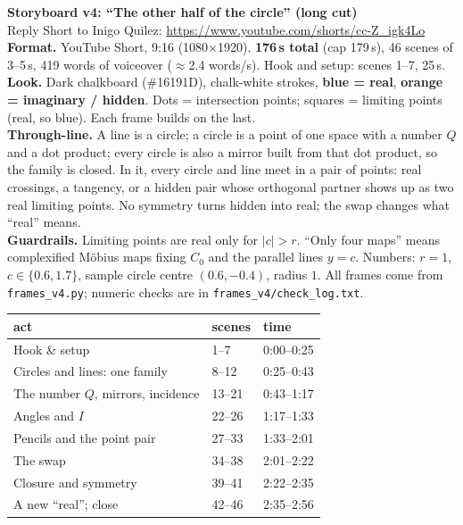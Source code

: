 \documentclass[10pt]{article}
\begin{document}
{\LARGE\bfseries Storyboard v4: ``The other half of the circle'' (long cut)}\\[3pt]
Reply Short to Inigo Quilez: \url{https://www.youtube.com/shorts/cc-Z_igk4Lo}\\[6pt]
\textbf{Format.} YouTube Short, 9:16 (1080$\times$1920). \textbf{176\,s total} (cap 179\,s), 46 scenes of 3--5\,s, 419 words of voiceover ($\approx$2.4 words/s). Hook and setup: scenes 1--7, 25\,s.\\
\textbf{Look.} Dark chalkboard (\#16191D), chalk-white strokes, \textcolor[HTML]{4DA3FF}{\textbf{blue = real}}, \textcolor[HTML]{FF9A3C}{\textbf{orange = imaginary / hidden}}. Dots = intersection points; squares = limiting points (real, so blue). Each frame builds on the last.\\
\textbf{Through-line.} A line is a circle; a circle is a point of one space with a number $Q$ and a dot product; every circle is also a mirror built from that dot product, so the family is closed. In it, every circle and line meet in a pair of points: real crossings, a tangency, or a hidden pair whose orthogonal partner shows up as two real limiting points. No symmetry turns hidden into real; the swap changes what ``real'' means.\\[4pt]
\textbf{Guardrails.} Limiting points are real only for $|c|>r$. ``Only four maps'' means complexified Möbius maps fixing $C_0$ and the parallel lines $y=c$. Numbers: $r=1$, $c\in\{0.6,1.7\}$, sample circle centre $(0.6,-0.4)$, radius $1$. All frames come from \texttt{frames\_v4.py}; numeric checks are in \texttt{frames\_v4/check\_log.txt}.\\[4pt]
{\small\begin{tabular}{lll}\toprule act & scenes & time\\\midrule Hook \& setup & 1--7 & 0:00--0:25 \\ Circles and lines: one family & 8--12 & 0:25--0:43 \\ The number $Q$, mirrors, incidence & 13--21 & 0:43--1:17 \\ Angles and $I$ & 22--26 & 1:17--1:33 \\ Pencils and the point pair & 27--33 & 1:33--2:01 \\ The swap & 34--38 & 2:01--2:22 \\ Closure and symmetry & 39--41 & 2:22--2:35 \\ A new ``real''; close & 42--46 & 2:35--2:56 \\\bottomrule\end{tabular}}\\[4pt]
\end{document}
